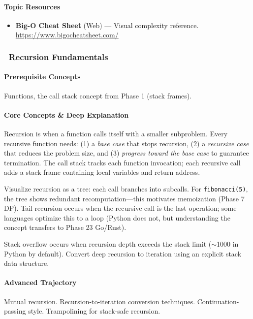 \documentclass[11pt, a4paper, oneside]{report}
\newcommand{\mustmaster}[1]{\subsubsection{\texorpdfstring{\fcolorbox{blue!40!black}{blue!8}{\footnotesize\bfseries\color{blue!40!black} MUST MASTER}~#1}{#1}}}
\begin{document}
\paragraph{Topic Resources}
\begin{itemize}[leftmargin=*]
\item \textbf{Big-O Cheat Sheet} (Web) --- Visual complexity reference. \url{https://www.bigocheatsheet.com/}
\end{itemize}

\mustmaster{Recursion Fundamentals}

\paragraph{Prerequisite Concepts} Functions, the call stack concept from Phase 1 (stack frames).

\paragraph{Core Concepts \& Deep Explanation} Recursion is when a function calls itself with a smaller subproblem. Every recursive function needs: (1) a \emph{base case} that stops recursion, (2) a \emph{recursive case} that reduces the problem size, and (3) \emph{progress toward the base case} to guarantee termination. The call stack tracks each function invocation; each recursive call adds a stack frame containing local variables and return address.

Visualize recursion as a tree: each call branches into subcalls. For \texttt{fibonacci(5)}, the tree shows redundant recomputation---this motivates memoization (Phase 7 DP). Tail recursion occurs when the recursive call is the last operation; some languages optimize this to a loop (Python does not, but understanding the concept transfers to Phase 23 Go/Rust).

Stack overflow occurs when recursion depth exceeds the stack limit ($\sim$1000 in Python by default). Convert deep recursion to iteration using an explicit stack data structure.

\paragraph{Advanced Trajectory} Mutual recursion. Recursion-to-iteration conversion techniques. Continuation-passing style. Trampolining for stack-safe recursion.
\end{document}
